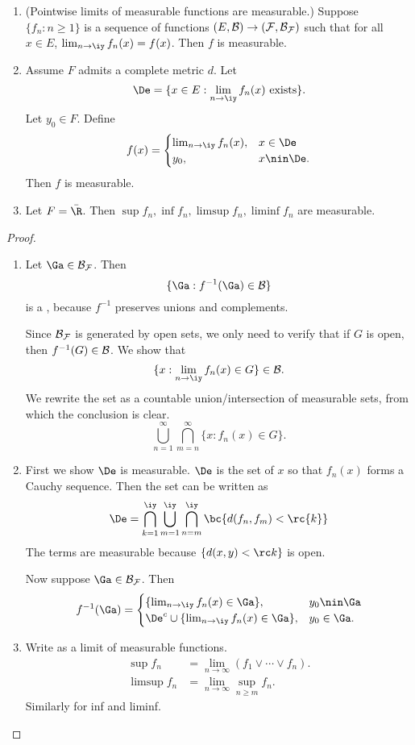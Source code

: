 \begin{pr}
\begin{enumerate}
\item (Pointwise limits of measurable functions are measurable.)
Suppose $\{f_n:n\geq 1\}$ is a sequence of functions $(E, \cal B)\to (F,\cal B_F)$ such that for all $x\in E$,  $\lim_{n\to \iy}f_n(x)=f(x)$. Then $f$ is measurable.
\item Assume $F$ admits a complete metric $d$. Let
\[
\De=\{x\in E:\lim_{n\to \iy}f_n(x)\text{ exists}\}.
\]
Let $y_0\in F$. Define
\[
f(x)=\begin{cases}
\lim_{n\to \iy} f_n(x),&x\in \De\\
y_0,&x\nin \De.
\end{cases}
\]
Then $f$ is measurable.
\item Let $F=\bar{\R}$. Then $\sup f_n, \inf f_n, \limsup f_n,\liminf f_n$ are measurable.
\end{enumerate}
\end{pr}
\begin{proof}
\begin{enumerate}
\item
Let $\Ga\in \cal B_F$. Then
\[
\{\Ga: f^{-1}(\Ga)\in \cal B\}
\]
is a \sia, because $f^{-1}$ preserves unions and complements. 

Since $\cal B_F$ is generated by open sets,  we only need to verify that if $G$ is open, then $f^{-1}(G)\in \cal B$. We show that
\[
\{x:\lim_{n\to \iy} f_n(x)\in G\}\in \cal B.
\]
We rewrite the set as a countable union/intersection of measurable sets, from which the conclusion is clear.
\[
\bigcup_{n=1}^{\infty} \bigcap_{m=n}^{\infty} \{x:f_n(x)\in G\}.
\]
\item First we show $\De$ is measurable. $\De$ is the set of $x$ so that $f_n(x)$ forms a Cauchy sequence. Then the set can be written as
\[
\De=
\bigcap_{k=1}^{\iy} \bigcup_{m=1}^{\iy} \bigcap_{n=m}^{\iy}\bc{d(f_n,f_m)<\rc{k}}
\]
The terms are measurable because $\{d(x,y)<\rc k\}$ is open.

Now suppose $\Ga\in \cal B_F$. Then %
\[
f^{-1}(\Ga)=\begin{cases}
\{\lim_{n\to \iy} f_n(x)\in \Ga\},%
&y_0\nin \Ga\\
\De^c\cup \{\lim_{n\to \iy} f_n(x)\in \Ga\},&y_0\in \Ga.
\end{cases}
\]
\item Write %
as a limit of measurable functions.
\begin{align*}
\sup f_n &= \lim_{n\to \infty} (f_1\vee \cdots \vee f_n).\\
\limsup f_n &= \lim_{n\to \infty} \sup_{n\geq m} f_n.
\end{align*}
Similarly for inf and liminf.
\end{enumerate}
\end{proof}
